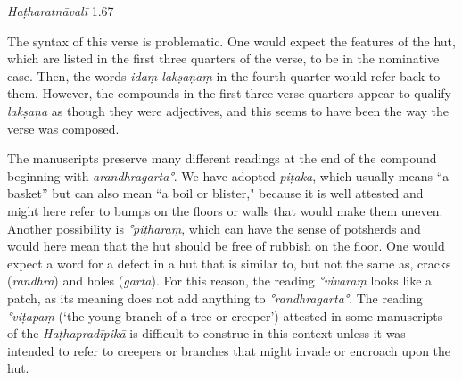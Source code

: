 \begin{ekdosis}
\begin{testimonia}[hp01_013]
\begin{versinnote}
\tl{\var{°vimalaṃ ] L, mavilaṃ N}\\!}
\end{versinnote}

\emph{Haṭharatnāvalī} 1.67

\begin{versinnote}
\tl{\var{°piṭharaṃ ] piṭakaṃ J,n2, peṭakaṃ N}\\!}
\end{versinnote}

\end{testimonia}

\begin{philcomm}[hp01_013]  
The syntax of this verse is problematic. One would expect the features of the hut, which are listed in the first three quarters of the verse, to be in the nominative case. Then, the words \emph{idaṃ lakṣaṇaṃ} in the fourth quarter would refer back to them. However, the compounds in the first three verse-quarters appear to qualify \emph{lakṣaṇa} as though they were adjectives, and this seems to have been the way the verse was composed.     

The manuscripts preserve many different readings at the end of the compound beginning with \emph{arandhragarta°}. We have adopted \emph{piṭaka}, which usually means ``a basket'' but can also mean ``a boil or blister," because it is well attested and might here refer to bumps on the floors or walls that would make them uneven. Another possibility is \emph{°piṭharaṃ}, which can have the sense of potsherds and would here mean that the hut should be free of rubbish on the floor. One would expect a word for a defect in a hut that is similar to, but not the same as, cracks (\emph{randhra}) and holes (\emph{garta}). For this reason, the reading \emph{°vivaraṃ} looks like a patch, as its meaning does not add anything to \emph{°randhragarta°}. The reading \emph{°viṭapaṃ} (`the young branch of a tree or creeper') attested in some manuscripts of the \emph{Haṭhapradīpikā} is difficult to construe in this context unless it was intended to refer to creepers or branches that might invade or encroach upon the hut.


\end{philcomm}
\end{ekdosis}
